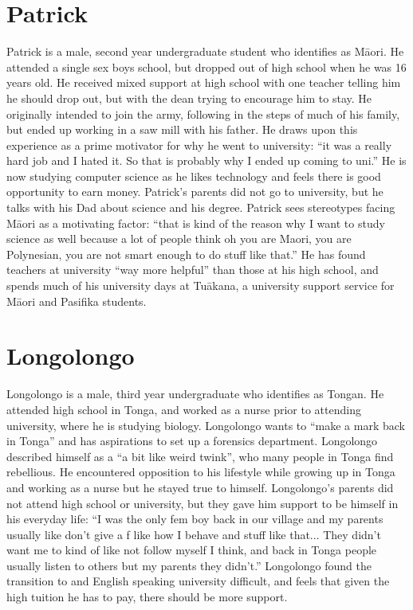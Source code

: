 \section*{Patrick}
Patrick is a male, second year undergraduate student who identifies as M\={a}ori. He attended a single sex boys school, but dropped out of high school when he was 16 years old. He received mixed support at high school with one teacher telling him he should drop out, but with the dean trying to encourage him to stay. He originally intended to join the army, following in the steps of much of his family, but ended up working in a saw mill with his father. He draws upon this experience as a prime motivator for why he went to university: ``it was a really hard job and I hated it. So that is probably why I ended up coming to uni.'' He is now studying computer science as he likes technology and feels there is good opportunity to earn money. Patrick's parents did not go to university, but he talks with his Dad about science and his degree. Patrick sees stereotypes facing M\={a}ori as a motivating factor: ``that is kind of the reason why I want to study science as well because a lot of people think oh you are Maori, you are Polynesian, you are not smart enough to do stuff like that.'' He has found teachers at university ``way more helpful'' than those at his high school, and spends much of his university days at Tu\={a}kana, a university support service for M\={a}ori and Pasifika students.  

\section*{Longolongo}
Longolongo  is a male, third year undergraduate who identifies as Tongan. He attended high school in Tonga, and worked as a nurse prior to attending university, where he is studying biology. Longolongo wants to ``make a mark back in Tonga'' and has aspirations to set up a forensics department. Longolongo described himself as a ``a bit like weird twink'', who many people in Tonga find rebellious. He encountered opposition to his lifestyle while growing up in Tonga and working as a nurse but he stayed true to himself. Longolongo's parents did not attend high school or university, but they gave him support to be himself in his everyday life: ``I was the only fem boy back in our village and my parents usually like don’t give a f like how I behave and stuff like that... They didn't want me to kind of like not follow myself I think, and back in Tonga people usually listen to others but my parents they didn't.'' Longolongo found the transition to and English speaking university difficult, and feels that given the high tuition he has to pay, there should be more support. 


